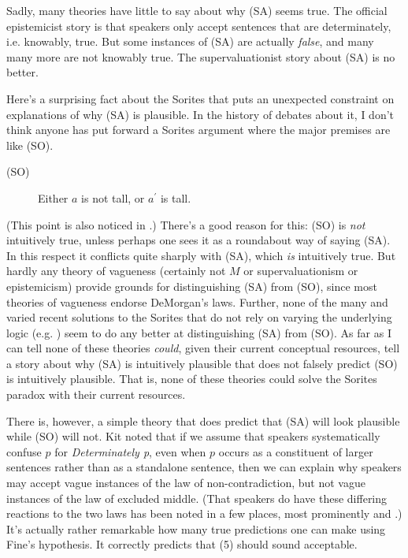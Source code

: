 Sadly, many theories have little to say about why (SA) seems true. The
official epistemicist story is that speakers only accept sentences that
are determinately, i.e. knowably, true. But some instances of (SA) are
actually \emph{false}, and many many more are not knowably true. The
supervaluationist story about (SA) is no better.

Here's a surprising fact about the Sorites that puts an unexpected
constraint on explanations of why (SA) is plausible. In the history of
debates about it, I don't think anyone has put forward a Sorites
argument where the major premises are like (SO).

\begin{description}
\item[(SO)]
Either \(a\) is not tall, or \(a ^\prime\) is tall.
\end{description}

(This point is also noticed in \citet{SiderBraun}.) There's a good
reason for this: (SO) is \emph{not} intuitively true, unless perhaps one
sees it as a roundabout way of saying (SA). In this respect it conflicts
quite sharply with (SA), which \emph{is} intuitively true. But hardly
any theory of vagueness (certainly not \(M\) or supervaluationism or
epistemicism) provide grounds for distinguishing (SA) from (SO), since
most theories of vagueness endorse DeMorgan's laws. Further, none of the
many and varied recent solutions to the Sorites that do not rely on
varying the underlying logic (e.g.
\citet{Fara2000, Sorensen2001, Eklund2002}) seem to do any better at
distinguishing (SA) from (SO). As far as I can tell none of these
theories \emph{could}, given their current conceptual resources, tell a
story about why (SA) is intuitively plausible that does not falsely
predict (SO) is intuitively plausible. That is, none of these theories
could solve the Sorites paradox with their current resources.

There is, however, a simple theory that does predict that (SA) will look
plausible while (SO) will not. Kit \citet{Fine1975a} noted that if we
assume that speakers systematically confuse \(p\) for
\emph{Determinately p}, even when \(p\) occurs as a constituent of
larger sentences rather than as a standalone sentence, then we can
explain why speakers may accept vague instances of the law of
non-contradiction, but not vague instances of the law of excluded
middle. (That speakers do have these differing reactions to the two laws
has been noted in a few places, most prominently \citet{Burgess1987} and
\citet{Tappenden1993}.) It's actually rather remarkable how many true
predictions one can make using Fine's hypothesis. It correctly predicts
that (5) should sound acceptable.

